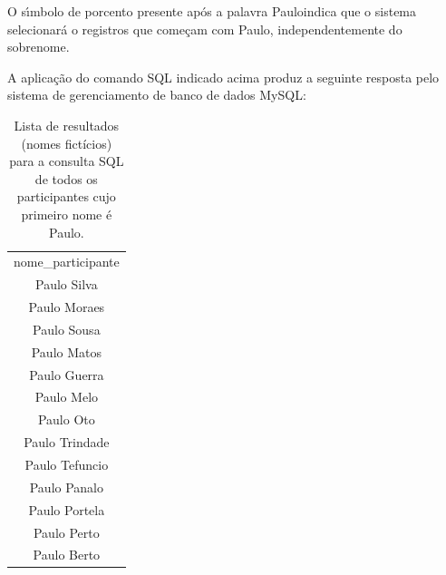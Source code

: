 \documentclass[
12pt,		%
openright,	%
twoside,  %
a4paper,			%
chapter=TITLE,		%
english,			%
french,				%
spanish,			%
brazil				%
]{USPSC-classe/USPSC}
\begin{document}
\noindent\begin{center}\mbox{\centering{}}\end{center}


O s\'{\i}mbolo de porcento presente ap\'os a palavra \textquotedbl Paulo\textquotedbl  indica que o sistema selecionar\'a o registros que come\c{c}am com \textquotedbl Paulo\textquotedbl , independentemente do sobrenome.














A aplica\c{c}\~ao do comando SQL indicado acima produz a seguinte resposta pelo sistema de gerenciamento de banco de dados MySQL:


















\begin{table}[htb]
\tiny
\caption{\label{fe3cd6334e1b9072eda70730e1734e26869d9c57}Lista de resultados (nomes fict\'{i}cios) para a consulta SQL de todos os participantes cujo primeiro nome \'e Paulo.}

\centering
\begin{tabular}{|c|}
\hline
nome\_participante        \\
Paulo Silva              \\
Paulo Moraes \\
Paulo Sousa \\
Paulo Matos \\
Paulo Guerra \\
Paulo Melo \\
Paulo Oto \\
Paulo Trindade \\
Paulo Tefuncio \\
Paulo Panalo \\
Paulo Portela \\
Paulo Perto \\
Paulo Berto \\
\hline
\end{tabular}
\end{table}
\end{document}
